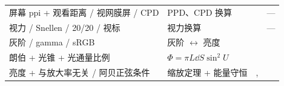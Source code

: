 {\begin{longtable}{@{}P{5.9cm}P{5.1cm}P{2.9cm}P{2.1cm}@{}}
屏幕 ppi + 观看距离 / 视网膜屏 / CPD & PPD、CPD 换算 & \pageref{sec:screencpd} & —\\
视力 / Snellen / 20/20 / 视标 & 视力换算 & \pageref{sec:acuity} & —\\
灰阶 / gamma / sRGB & 灰阶 $\leftrightarrow$ 亮度 & \pageref{sec:gammacalc} & \pageref{sec:exgC}\\
朗伯 + 光锥 + 光通量比例 & $\Phi=\pi L\dd S\sin^2U$ & \pageref{sec:lambert} & \pageref{sec:exgC}\\
亮度 + 与放大率无关 / 阿贝正弦条件 & 缩放定理 + 能量守恒 & \pageref{sec:abbesine}, \pageref{sec:luminance} & \pageref{sec:exgC}\\
\end{longtable}}
